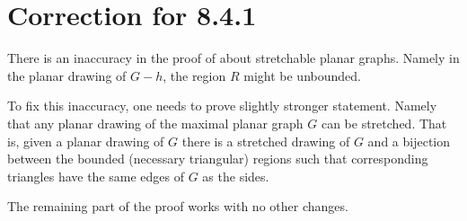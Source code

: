 \appendix
\chapter{Correction for 8.4.1}

There is an inaccuracy in the proof of \cite[Theorem 8.4.1]{pearls} about stretchable planar graphs.
Namely in the planar drawing of $G-h$, the region $R$ might be unbounded.

To fix this inaccuracy, one needs to prove slightly stronger statement.
Namely that any planar drawing of the maximal planar graph $G$ can be stretched.
That is, given a planar drawing of $G$ there is a stretched drawing of $G$ 
and a bijection between the bounded (necessary triangular) regions such that corresponding triangles have the same edges of $G$ as the sides.

The remaining part of the proof works with no other changes.
